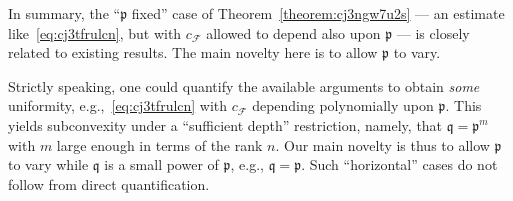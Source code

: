 \documentclass[reqno]{amsart}
\theoremstyle{plain} \newtheorem{theorem} {Theorem} \newtheorem{conjecture} {Conjecture} \newtheorem{corollary} [theorem] {Corollary} \newtheorem{proposition} [theorem] {Proposition} \newtheorem{fact} [theorem] {Fact}
\theoremstyle{definition} \newtheorem{definition} [theorem] {Definition}
\theoremstyle{itplain} %
\begin{document}
In summary, the ``$\mathfrak{p}$ fixed'' case of Theorem~\ref{theorem:cj3ngw7u2s} --- an estimate like~\eqref{eq:cj3tfrulcn}, but with $c_{\mathcal{F}}$ allowed to depend also upon $\mathfrak{p}$ --- is closely related to existing results.  The main novelty here is to allow $\mathfrak{p}$ to vary.

\begin{remark}
  Strictly speaking, one could quantify the available arguments to obtain \emph{some} uniformity, e.g.,~\eqref{eq:cj3tfrulcn} with $c_{\mathcal{F}}$ depending polynomially upon $\mathfrak{p}$.  This yields subconvexity under a ``sufficient depth'' restriction, namely, that $\mathfrak{q} = \mathfrak{p}^m$ with $m$ large enough in terms of the rank $n$.  Our main novelty is thus to allow $\mathfrak{p}$ to vary while $\mathfrak{q}$ is a small power of $\mathfrak{p}$, e.g., $\mathfrak{q} = \mathfrak{p}$.  Such ``horizontal'' cases do not follow from direct quantification.
\end{remark}
\end{document}
